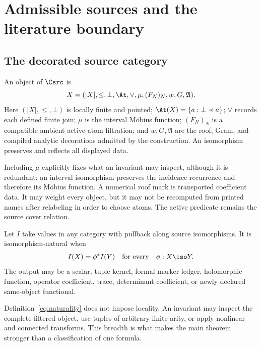 \section{Admissible sources and the literature boundary}
\label{sec:sources}

\subsection{The decorated source category}

\begin{definition}
An object of \(\Csrc\) is
\begin{equation}
 X=(|X|,\le,\bot,\At,\vee,\mu,(F_N)_N,w,G,\mathfrak A).
 \label{eq:decorated-source}
\end{equation}
Here \((|X|,\le,\bot)\) is locally finite and pointed;
\(\At(X)=\{a:\bot\prec a\}\); \(\vee\) records each defined finite join;
\(\mu\) is the interval M{\"o}bius function; \((F_N)_N\) is a compatible
ambient active-atom filtration; and \(w,G,\mathfrak A\) are the roof, Gram,
and compiled analytic decorations admitted by the construction.  An
isomorphism preserves and reflects all displayed data.
\end{definition}

Including \(\mu\) explicitly fixes what an invariant may inspect, although
it is redundant: an interval isomorphism preserves the incidence recurrence
and therefore its M{\"o}bius function.  A numerical roof mark is transported
coefficient data.  It may weight every object, but it may not be recomputed
from printed names after relabeling in order to choose atoms.  The active
predicate remains the source cover relation.

\begin{definition}
Let \(I\) take values in any category with pullback along source
isomorphisms.  It is isomorphism-natural when
\begin{equation}
 I(X)=\phi^*I(Y)
 \quad\text{for every}\quad \phi:X\iso Y.
 \label{eq:naturality}
\end{equation}
The output may be a scalar, tuple kernel, formal marker ledger, holomorphic
function, operator coefficient, trace, determinant coefficient, or newly
declared same-object functional.
\end{definition}

Definition~\ref{eq:naturality} does not impose locality.  An invariant may
inspect the complete filtered object, use tuples of arbitrary finite arity,
or apply nonlinear and connected transforms.  This breadth is what makes
the main theorem stronger than a classification of one formula.

